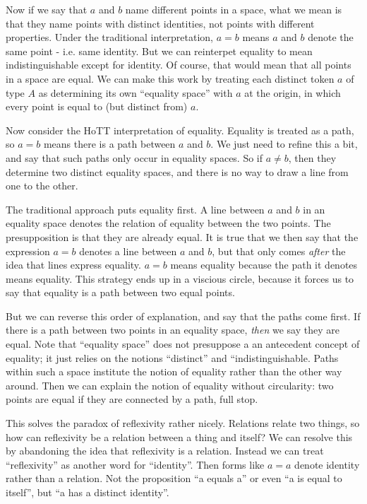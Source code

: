 \documentclass{article}
\begin{document}
Now if we say that \(a\) and \(b\) name different points in a space,
what we mean is that they name points with distinct identities, not
points with different properties. Under the traditional
interpretation, \(a=b\) means \(a\) and \(b\) denote the same point -
i.e. same identity. But we can reinterpet equality to mean
indistinguishable except for identity. Of course, that would mean that
all points in a space are equal. We can make this work by treating
each distinct token \(a\) of type \(A\) as determining its own
``equality space'' with \(a\) at the origin, in which every point is
equal to (but distinct from) \(a\).

Now consider the HoTT interpretation of equality. Equality is treated
as a path, so \(a=b\) means there is a path between \(a\) and \(b\).
We just need to refine this a bit, and say that such paths only occur
in equality spaces. So if \(a\neq b\), then they determine two
distinct equality spaces, and there is no way to draw a line from one
to the other.

The traditional approach puts equality first. A line between \(a\) and
\(b\) in an equality space denotes the relation of equality between
the two points. The presupposition is that they are already equal. It
is true that we then say that the expression \(a=b\) denotes a line
between \(a\) and \(b\), but that only comes \textit{after} the idea
that lines express equality. \(a=b\) means equality because the path
it denotes means equality. This strategy ends up in a viscious circle,
because it forces us to say that equality is a path between two equal
points.

But we can reverse this order of explanation, and say that the paths
come first. If there is a path between two points in an equality
space, \textit{then} we say they are equal. Note that ``equality
space'' does not presuppose a an antecedent concept of equality; it
just relies on the notions ``distinct'' and ``indistinguishable. Paths
within such a space institute the notion of equality rather than the
other way around. Then we can explain the notion of equality without
circularity: two points are equal if they are connected by a path,
full stop.

This solves the paradox of reflexivity rather nicely. Relations relate
two things, so how can reflexivity be a relation between a thing and
itself? We can resolve this by abandoning the idea that reflexivity is
a relation. Instead we can treat ``reflexivity'' as another word for
``identity''. Then forms like \(a=a\) denote identity rather than a
relation. Not the proposition ``a equals a'' or even ``a is equal to
itself'', but ``a has a distinct identity''.
\end{document}
